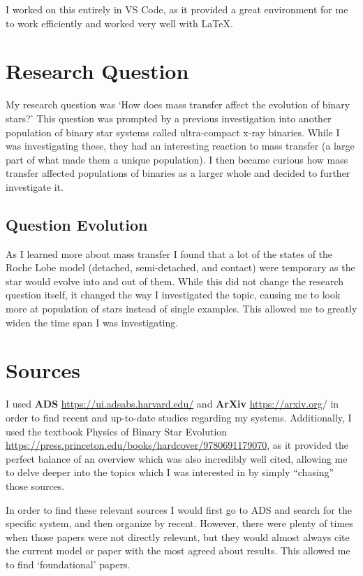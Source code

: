 \documentclass[12pt, a4paper]{article}
\begin{document}
    I worked on this entirely in VS Code, as it provided a great environment for me to work efficiently and worked very well with \LaTeX.

\section{Research Question}
    My research question was `How does mass transfer affect the evolution of binary stars?' This question was prompted by a previous investigation into another population of binary star systems called ultra-compact x-ray binaries. While I was investigating these, they had an interesting reaction to mass transfer (a large part of what made them a unique population). I then became curious how mass transfer affected populations of binaries as a larger whole and decided to further investigate it.

    \subsection{Question Evolution}    
        As I learned more about mass transfer I found that a lot of the states of the Roche Lobe model (detached, semi-detached, and contact) were temporary as the star would evolve into and out of them. While this did not change the research question itself, it changed the way I investigated the topic, causing me to look more at population of stars instead of single examples. This allowed me to greatly widen the time span I was investigating.
\section{Sources}
    I used \textbf{ADS} \url{https://ui.adsabs.harvard.edu/} and \textbf{ArXiv} \url{https://arxiv.org}/ in order to find recent and up-to-date studies regarding my systems. Additionally, I used the textbook Physics of Binary Star Evolution \url{https://press.princeton.edu/books/hardcover/9780691179070}, as it provided the perfect balance of an overview which was also incredibly well cited, allowing me to delve deeper into the topics which I was interested in by simply ``chasing'' those sources. 

    In order to find these relevant sources I would first go to ADS and search for the specific system, and then organize by recent. However, there were plenty of times when those papers were not directly relevant, but they would almost always cite the current model or paper with the most agreed about results. This allowed me to find `foundational' papers.
\end{document}
